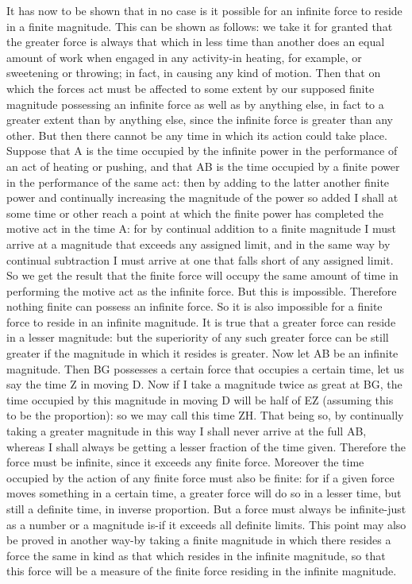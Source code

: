 It has now to be shown that in no case is it possible for an infinite
force to reside in a finite magnitude. This can be shown as follows:
we take it for granted that the greater force is always that which
in less time than another does an equal amount of work when engaged
in any activity-in heating, for example, or sweetening or throwing;
in fact, in causing any kind of motion. Then that on which the forces
act must be affected to some extent by our supposed finite magnitude
possessing an infinite force as well as by anything else, in fact
to a greater extent than by anything else, since the infinite force
is greater than any other. But then there cannot be any time in which
its action could take place. Suppose that A is the time occupied by
the infinite power in the performance of an act of heating or pushing,
and that AB is the time occupied by a finite power in the performance
of the same act: then by adding to the latter another finite power
and continually increasing the magnitude of the power so added I shall
at some time or other reach a point at which the finite power has
completed the motive act in the time A: for by continual addition
to a finite magnitude I must arrive at a magnitude that exceeds any
assigned limit, and in the same way by continual subtraction I must
arrive at one that falls short of any assigned limit. So we get the
result that the finite force will occupy the same amount of time in
performing the motive act as the infinite force. But this is impossible.
Therefore nothing finite can possess an infinite force. So it is also
impossible for a finite force to reside in an infinite magnitude.
It is true that a greater force can reside in a lesser magnitude:
but the superiority of any such greater force can be still greater
if the magnitude in which it resides is greater. Now let AB be an
infinite magnitude. Then BG possesses a certain force that occupies
a certain time, let us say the time Z in moving D. Now if I take a
magnitude twice as great at BG, the time occupied by this magnitude
in moving D will be half of EZ (assuming this to be the proportion):
so we may call this time ZH. That being so, by continually taking
a greater magnitude in this way I shall never arrive at the full AB,
whereas I shall always be getting a lesser fraction of the time given.
Therefore the force must be infinite, since it exceeds any finite
force. Moreover the time occupied by the action of any finite force
must also be finite: for if a given force moves something in a certain
time, a greater force will do so in a lesser time, but still a definite
time, in inverse proportion. But a force must always be infinite-just
as a number or a magnitude is-if it exceeds all definite limits. This
point may also be proved in another way-by taking a finite magnitude
in which there resides a force the same in kind as that which resides
in the infinite magnitude, so that this force will be a measure of
the finite force residing in the infinite magnitude. 

